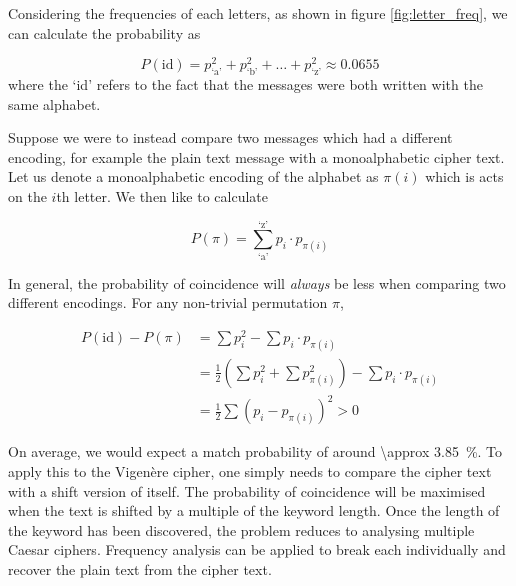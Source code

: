 Considering the frequencies of each letters, as shown in figure \ref{fig:letter_freq}, we can calculate the probability as

\begin{equation}
	P(\text{id}) = p_\text{`a'}^2 + p_\text{`b'}^2 + \dots +p_\text{`z'}^2 \approx 0.0655
\end{equation}
where the `id' refers to the fact that the messages were both written with the same alphabet.

Suppose we were to instead compare two messages which had a different encoding, for example the plain text message with a monoalphabetic cipher text. Let us denote a monoalphabetic encoding of the alphabet as $\pi(i)$ which is acts on the $i$th letter. We then like to calculate

\begin{equation}
	P(\pi) = \sum_\text{`a'}^\text{`z'} p_i \cdot p_{\pi(i)}
\end{equation}

In general, the probability of coincidence will \emph{always} be less when comparing two different encodings. For any non-trivial permutation $\pi$,

\begin{align}
	P(\text{id}) - P(\pi) &= \sum p_i^2 - \sum p_i \cdot p_{\pi(i)}\\
	&= \frac{1}{2}\left(\sum p_i^2 + \sum p_{\pi(i)}^2\right) - \sum p_i \cdot p_{\pi(i)}\\
	&= \frac{1}{2} \sum (p_i - p_{\pi(i)})^2 > 0
\end{align}

On average, we would expect a match probability of around  \SI{\approx 3.85}{\percent}. To apply this to the Vigen\`{e}re cipher, one simply needs to compare the cipher text with a shift version of itself. The probability of coincidence will be maximised when the text is shifted by a multiple of the keyword length. Once the length of the keyword has been discovered, the problem reduces to analysing multiple Caesar ciphers. Frequency analysis can be applied to break each individually and recover the plain text from the cipher text. 

%

